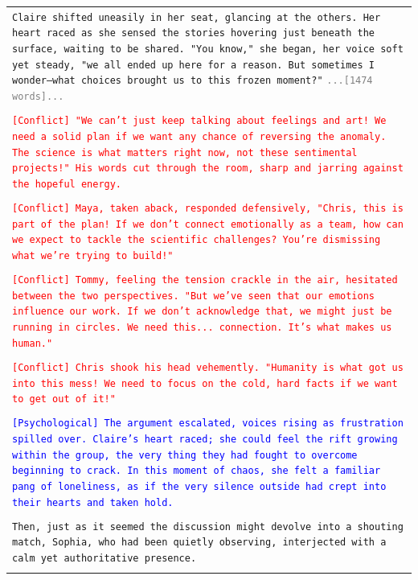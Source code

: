 \documentclass[letterpaper]{article} %
\begin{document}
\begin{small}
\begin{longtable}{p{\textwidth}}
    \texttt{Claire shifted uneasily in her seat, glancing at the others. Her heart raced as she sensed the stories hovering just beneath the surface, waiting to be shared. "You know," she began, her voice soft yet steady, "we all ended up here for a reason. But sometimes I wonder—what choices brought us to this frozen moment?"}
    \texttt{\textcolor{gray}{...[1474 words]...}} \\\\

    \texttt{\textcolor{red}{[Conflict] "We can't just keep talking about feelings and art! We need a solid plan if we want any chance of reversing the anomaly. The science is what matters right now, not these sentimental projects!" His words cut through the room, sharp and jarring against the hopeful energy.}} \\\\

    \texttt{\textcolor{red}{[Conflict] Maya, taken aback, responded defensively, "Chris, this is part of the plan! If we don't connect emotionally as a team, how can we expect to tackle the scientific challenges? You're dismissing what we're trying to build!"}} \\\\

    \texttt{\textcolor{red}{[Conflict] Tommy, feeling the tension crackle in the air, hesitated between the two perspectives. "But we've seen that our emotions influence our work. If we don't acknowledge that, we might just be running in circles. We need this... connection. It's what makes us human."}} \\\\

    \texttt{\textcolor{red}{[Conflict] Chris shook his head vehemently. "Humanity is what got us into this mess! We need to focus on the cold, hard facts if we want to get out of it!"}} \\\\

    \texttt{\textcolor{blue}{[Psychological] The argument escalated, voices rising as frustration spilled over. Claire's heart raced; she could feel the rift growing within the group, the very thing they had fought to overcome beginning to crack. In this moment of chaos, she felt a familiar pang of loneliness, as if the very silence outside had crept into their hearts and taken hold.}} \\\\

    \texttt{Then, just as it seemed the discussion might devolve into a shouting match, Sophia, who had been quietly observing, interjected with a calm yet authoritative presence.} \\\\


\end{longtable}
\end{small}
\end{document}
